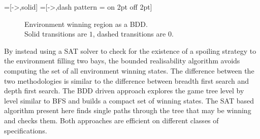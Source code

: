 =[->,solid]
=[->,dash pattern = on 2pt off 2pt]
\begin{figure}
    \centering
    \captionsetup{justification=centering}
    \caption[Environment winning region as a BDD]{Environment winning region as a BDD.\\Solid transitions are $1$, dashed transitions are $0$.}
    \label{fig:strengthsexamplebdd}
\end{figure}

By instead using a SAT solver to check for the existence of a spoiling strategy to the environment filling two bays, the bounded realisability algorithm avoids computing the set of all environment winning states. The difference between the two methodologies is similar to the difference between breadth first search and depth first search. The BDD driven approach explores the game tree level by level similar to BFS and builds a compact set of winning states. The SAT based algorithm present here finds single paths through the tree that may be winning and checks them. Both approaches are efficient on different classes of specifications.

